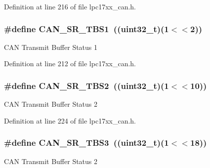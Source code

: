 \-Definition at line 216 of file lpc17xx\-\_\-can.\-h.

\hypertarget{group___c_a_n___private___macros_gaa708822ccef44d559b9747b515697e21}{
\subsubsection[{\-C\-A\-N\-\_\-\-S\-R\-\_\-\-T\-B\-S1}]{\setlength{\rightskip}{0pt plus 5cm}\#define {\bf \-C\-A\-N\-\_\-\-S\-R\-\_\-\-T\-B\-S1}~((uint32\-\_\-t)(1$<$$<$2))}}\label{group___c_a_n___private___macros_gaa708822ccef44d559b9747b515697e21}
\-C\-A\-N \-Transmit \-Buffer \-Status 1 

\-Definition at line 212 of file lpc17xx\-\_\-can.\-h.

\hypertarget{group___c_a_n___private___macros_ga33d1ba06704b035fabbf3f253e31bd5b}{
\subsubsection[{\-C\-A\-N\-\_\-\-S\-R\-\_\-\-T\-B\-S2}]{\setlength{\rightskip}{0pt plus 5cm}\#define {\bf \-C\-A\-N\-\_\-\-S\-R\-\_\-\-T\-B\-S2}~((uint32\-\_\-t)(1$<$$<$10))}}\label{group___c_a_n___private___macros_ga33d1ba06704b035fabbf3f253e31bd5b}
\-C\-A\-N \-Transmit \-Buffer \-Status 2 

\-Definition at line 224 of file lpc17xx\-\_\-can.\-h.

\hypertarget{group___c_a_n___private___macros_gaadef7cf5e176d34bb303a9b7d25d9454}{
\subsubsection[{\-C\-A\-N\-\_\-\-S\-R\-\_\-\-T\-B\-S3}]{\setlength{\rightskip}{0pt plus 5cm}\#define {\bf \-C\-A\-N\-\_\-\-S\-R\-\_\-\-T\-B\-S3}~((uint32\-\_\-t)(1$<$$<$18))}}\label{group___c_a_n___private___macros_gaadef7cf5e176d34bb303a9b7d25d9454}
\-C\-A\-N \-Transmit \-Buffer \-Status 2 

